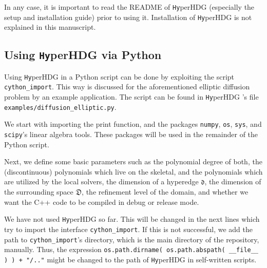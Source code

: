 \documentclass[a4paper, english, 12pt, reqno, draft]{amsart}
\theoremstyle{definition}
\theoremstyle{remark}
\numberwithin{equation}{section}
\newcommand{\hyperHDG}{{\fontfamily{pzc}\selectfont \texttt{Hy}\hspace{-1.5pt}perHDG }}
\newcommand{\locDim}{\ensuremath{\mathfrak d}}
\newcommand{\globDim}{\ensuremath{\mathfrak D}}
\newcommand{\code}[1]{\texttt{#1}}
\begin{document}
In any case, it is important to read the README of \hyperHDG (especially the setup and installation guide) prior to using it. Installation of \hyperHDG is not explained in this manuscript.
%
\subsection{Using \hyperHDG via Python}\label{SEC:python_script}
%
Using \hyperHDG in a Python script can be done by exploiting the script \code{cython\_import}. This way is discussed for the aforementioned elliptic diffusion problem by an example application. The script can be found in \hyperHDG's file \code{examples/\-diffusion\_elliptic.py}.

We start with importing the print function, and the packages \code{numpy}, \code{os}, \code{sys}, and \code{scipy}'s linear algebra tools. These packages will be used in the remainder of the Python script.
%

%
Next, we define some basic parameters such as the polynomial degree of both, the (discontinuous) polynomials which live on the skeletal, and the polynomials which are utilized by the local solvers, the dimension of a hyperedge $\locDim$, the dimension of the surrounding space $\globDim$, the refinement level of the domain, and whether we want the C++ code to be compiled in debug or release mode.
%

%
We have not used \hyperHDG so far. This will be changed in the next lines which try to import the interface \code{cython\_import}. If this is not successful, we add the path to \code{cython\_import}'s directory, which is the main directory of the repository, manually. Thus, the expression \code{os.path.dirname( os.path.abspath( \_\_file\_\_ ) ) + "/.."} might be changed to the path of \hyperHDG in self-written scripts.
%

%
\end{document}

